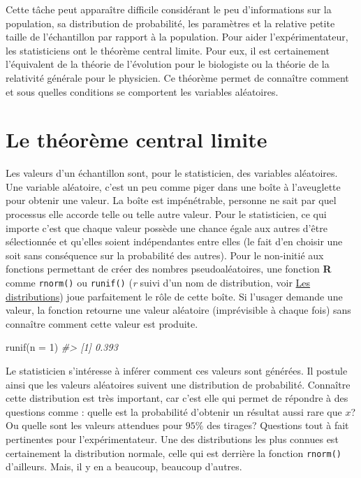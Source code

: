 \documentclass[
]{book}
\newenvironment{Shaded}{}{}
\newcommand{\AttributeTok}[1]{#1}
\newcommand{\CommentTok}[1]{\textit{#1}}
\newcommand{\DecValTok}[1]{#1}
\newcommand{\FunctionTok}[1]{#1}
\newcommand{\NormalTok}[1]{#1}
\begin{document}
Cette tâche peut apparaître difficile considérant le peu d'informations sur la population, sa distribution de probabilité, les paramètres et la relative petite taille de l'échantillon par rapport à la population. Pour aider l'expérimentateur, les statisticiens ont le théorème central limite. Pour eux, il est certainement l'équivalent de la théorie de l'évolution pour le biologiste ou la théorie de la relativité générale pour le physicien. Ce théorème permet de connaître comment et sous quelles conditions se comportent les variables aléatoires.

\hypertarget{le-thuxe9oruxe8me-central-limite}{%
\section{Le théorème central limite}\label{le-thuxe9oruxe8me-central-limite}}

Les valeurs d'un échantillon sont, pour le statisticien, des variables aléatoires. Une variable aléatoire, c'est un peu comme piger dans une boîte à l'aveuglette pour obtenir une valeur. La boîte est impénétrable, personne ne sait par quel processus elle accorde telle ou telle autre valeur. Pour le statisticien, ce qui importe c'est que chaque valeur possède une chance égale aux autres d'être sélectionnée et qu'elles soient indépendantes entre elles (le fait d'en choisir une soit sans conséquence sur la probabilité des autres). Pour le non-initié aux fonctions permettant de créer des nombres pseudoaléatoires, une fonction \textbf{R} comme \texttt{rnorm()} ou \texttt{runif()} (\emph{r} suivi d'un nom de distribution, voir \protect\hyperlink{les-distributions}{Les distributions}) joue parfaitement le rôle de cette boîte. Si l'usager demande une valeur, la fonction retourne une valeur aléatoire (imprévisible à chaque fois) sans connaître comment cette valeur est produite.

\begin{Shaded}
\begin{Highlighting}[]
\FunctionTok{runif}\NormalTok{(}\AttributeTok{n =} \DecValTok{1}\NormalTok{)}
\CommentTok{\#\textgreater{} [1] 0.393}
\end{Highlighting}
\end{Shaded}

Le statisticien s'intéresse à inférer comment ces valeurs sont générées. Il postule ainsi que les valeurs aléatoires suivent une distribution de probabilité. Connaître cette distribution est très important, car c'est elle qui permet de répondre à des questions comme : quelle est la probabilité d'obtenir un résultat aussi rare que \(x\)? Ou quelle sont les valeurs attendues pour \(95\%\) des tirages? Questions tout à fait pertinentes pour l'expérimentateur. Une des distributions les plus connues est certainement la distribution normale, celle qui est derrière la fonction \texttt{rnorm()} d'ailleurs. Mais, il y en a beaucoup, beaucoup d'autres.
\end{document}
